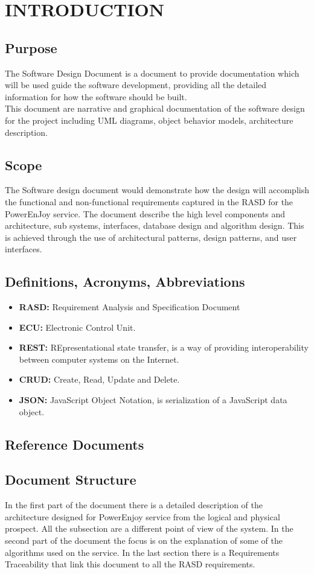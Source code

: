 \section{INTRODUCTION}
\subsection{Purpose}
The Software Design Document is a document to provide documentation which will be used guide the software development, providing all the detailed information for how the software should be built.\\
This document are narrative and graphical documentation of the software design for the project including UML diagrams, object behavior models, architecture description.
\subsection{Scope}
The Software design document would demonstrate how the design will accomplish the functional and non-functional requirements captured in the RASD for the PowerEnJoy service.
The document describe the high level components and architecture, sub systems, interfaces, database design and algorithm design. This is achieved through the use of architectural patterns, design patterns, and user interfaces. 
\subsection{Definitions, Acronyms, Abbreviations}
\begin{itemize}
	\item \textbf{RASD:} Requirement Analysis and Specification Document
	\item \textbf{ECU:} Electronic Control Unit. 
	\item \textbf{REST:} REpresentational state transfer, is a way of providing interoperability between computer systems on the Internet.
	\item \textbf{CRUD:} Create, Read, Update and Delete.
	\item \textbf{JSON:} JavaScript Object Notation, is serialization of a JavaScript data object.
\end{itemize}
\subsection{Reference Documents}

\subsection{Document Structure }
In the first part of the document there is a detailed description of the architecture designed for PowerEnjoy service from the logical and physical prospect. All the subsection are a different point of view of the system.
In the second part of the document the focus is on the explanation of some of the algorithms used on the service. In the last section there is a Requirements Traceability that link this document to all the RASD requirements.


\newpage
